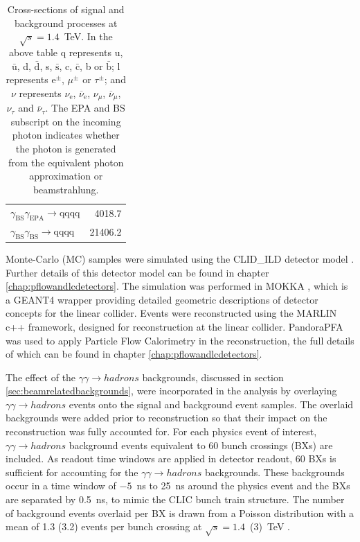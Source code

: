 \begin{table}[h!]
\begin{tabular}{ l r }
$\gamma_{\text{BS}}\gamma_{\text{EPA}} \rightarrow \text{qqqq}$ & 4018.7\\
$\gamma_{\text{BS}}\gamma_{\text{BS}} \rightarrow \text{qqqq}$ & 21406.2\\
\hline
\end{tabular}
\caption[Cross-sections of signal and background processes at $\sqrt{s}=1.4$~TeV]{Cross-sections of signal and background processes at $\sqrt{s}=1.4$~TeV.  In the above table q represents u, $\bar{\text{u}}$, d, $\bar{\text{d}}$, s, $\bar{\text{s}}$, c, $\bar{\text{c}}$, b or $\bar{\text{b}}$;  l represents $\text{e}^{\pm}$, $\mu^{\pm}$ or $\tau^{\pm}$; and $\nu$ represents $\nu_{\text{e}}$, $\overline{\nu}_{\text{e}}$, $\nu_{\mu}$, $\overline{\nu}_{\mu}$, $\nu_{\tau}$ and $\overline{\nu}_{\tau}$.  The EPA and BS subscript on the incoming photon indicates whether the photon is generated from the equivalent photon approximation or beamstrahlung.}
\label{table:crosssection1400GeV}
\end{table}

Monte-Carlo (MC) samples were simulated using the CLID\_ILD detector model \cite{arXiv:1006.3396}.  Further details of this detector model can be found in chapter \ref{chap:pflowandlcdetectors}.  The simulation was performed in MOKKA \cite{MoradeFreitas:2002kj}, which is a GEANT4 \cite{Agostinelli:2002hh} wrapper providing detailed geometric descriptions of detector concepts for the linear collider.  Events were reconstructed using the MARLIN \cite{Gaede:2006pj} c++ framework, designed for reconstruction at the linear collider.  PandoraPFA \cite{arXiv:0907.3577, arXiv:1209.4039} was used to apply Particle Flow Calorimetry in the reconstruction, the full details of which can be found in chapter \ref{chap:pflowandlcdetectors}.  
  
The effect of the $\gamma\gamma \rightarrow hadrons$ backgrounds, discussed in section \ref{sec:beamrelatedbackgrounds}, were incorporated in the analysis by overlaying $\gamma\gamma \rightarrow hadrons$ events onto the signal and background event samples.  The overlaid backgrounds were added prior to reconstruction so that their impact on the reconstruction was fully accounted for.  For each physics event of interest, $\gamma\gamma \rightarrow hadrons$ background events equivalent to 60 bunch crossings (BXs) are included.  As readout time windows are applied in detector readout, 60 BXs is sufficient for accounting for the $\gamma\gamma \rightarrow hadrons$ backgrounds.  These backgrounds occur in a time window of $-5$~ns to 25~ns around the physics event and the BXs are separated by 0.5~ns, to mimic the CLIC bunch train structure.  The number of background events overlaid per BX is drawn from a Poisson distribution with a mean of 1.3 (3.2) events per bunch crossing at $\sqrt{s}=1.4$~(3)~TeV \cite{Linssen:2012hp}.  

